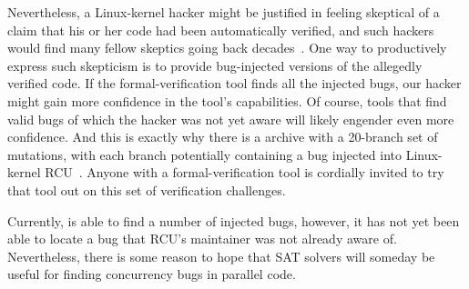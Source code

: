 Nevertheless, a Linux-kernel hacker might be justified in feeling skeptical
of a claim that his or her code had been automatically verified, and
such hackers would find many fellow skeptics going back
decades~\cite{DeMillo:1979:SPP:359104.359106}.
One way to productively express such skepticism is to provide bug-injected
versions of the allegedly verified code.
If the formal-verification tool finds all the injected bugs, our hacker
might gain more confidence in the tool's capabilities.
Of course, tools that find valid bugs of which the hacker was not yet aware
will likely engender even more confidence.
And this is exactly why there is a  archive with a 20-branch set
of mutations, with each branch potentially containing a bug injected
into Linux-kernel RCU~\cite{PaulEMcKenney2017VerificationChallenge6}.
Anyone with a formal-verification tool is cordially invited to try that
tool out on this set of verification challenges.

Currently,  is able to find a number of injected bugs,
however, it has not yet been able to locate a bug that RCU's
maintainer was not already aware of.
Nevertheless, there is some reason to hope that SAT solvers will someday
be useful for finding concurrency bugs in parallel code.
